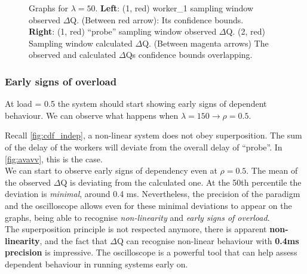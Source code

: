 \begin{figure}[H]
\begin{subfigure}{.5\textwidth}
                \label{fig:norm_ex_2}
            \end{subfigure}
            \caption{Graphs for $\lambda = 50$. \textbf{Left}: (1, red) worker\_1 sampling window observed $\Delta$Q. (Between red arrow): Its confidence bounds. \\
            \textbf{Right}: (1, red) ``probe'' sampling window observed $\Delta$Q. (2, red) Sampling window calculated $\Delta$Q. (Between magenta arrows) The observed and calculated $\Delta$Qs confidence bounds overlapping.}
            \label{fig:norm_ex}
        \end{figure}
    
\subsubsection{Early signs of overload}
    
    At load = 0.5 the system should start showing early signs of dependent behaviour. We can observe what happens when $\lambda = 150 \rightarrow \rho = 0.5$.
    
    Recall \ref{fig:cdf_indep}, a non-linear system does not obey superposition. The sum of the delay of the workers will deviate from the overall delay of ``probe''. In \cref{fig:avavv}, this is the case. \\
    We can start to observe early signs of dependency even at $\rho = 0.5$. The mean of the observed $\Delta$Q is deviating from the calculated one. At the 50th percentile the deviation is \textit{minimal}, around 0.4 ms. Nevertheless, the precision of the paradigm and the oscilloscope allows even for these minimal deviations to appear on the graphs, being able to recognise \textit{non-linearity} and \textit{early signs of overload}. \\
    The superposition principle is not respected anymore, there is apparent \textbf{non-linearity}, and the fact that $\Delta$Q can recognise non-linear behaviour with \textbf{0.4ms precision} is impressive. The oscilloscope is a powerful tool that can help assess dependent behaviour in running systems early on.
 

